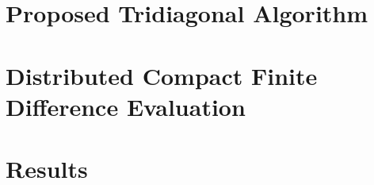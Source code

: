 \documentclass{beamer}
\begin{document}
\section{Proposed Tridiagonal Algorithm}
\section{Distributed Compact Finite Difference Evaluation}
\section{Results}
\end{document}
